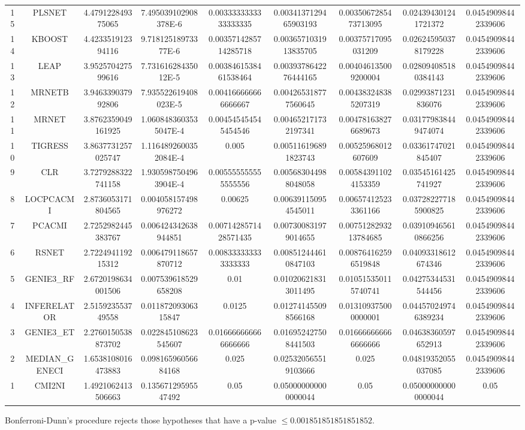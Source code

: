 \documentclass[a4paper,10pt]{article}
\begin{document}
\begin{landscape}
\begin{table}[!htp]
\begin{tabular}{ccccccccc}
15&PLSNET&4.479122849375065&7.495039102908378E-6&0.0033333333333333335&0.0034137129465903193&0.0035067285473713095&0.024394301241721372&0.04549098442339606\\
14&KBOOST&4.423351912394116&9.71812518973377E-6&0.0035714285714285718&0.0036571031913835705&0.00375717095031209&0.026245950378179228&0.04549098442339606\\
13&LEAP&3.952570427599616&7.73161628435012E-5&0.0038461538461538464&0.0039378642276444165&0.004046135009200004&0.028094085180384143&0.04549098442339606\\
12&MRNETB&3.946339037992806&7.935522619408023E-5&0.004166666666666667&0.004265318777560645&0.004383248385207319&0.02993871231836076&0.04549098442339606\\
11&MRNET&3.8762359049161925&1.0608483603535047E-4&0.004545454545454546&0.004652171732197341&0.004781638276689673&0.031779838449474074&0.04549098442339606\\
10&TIGRESS&3.8637731257025747&1.1164892600352084E-4&0.005&0.005116196891823743&0.00525968012607609&0.03361747021845407&0.04549098442339606\\
9&CLR&3.7279288322741158&1.9305987504963904E-4&0.005555555555555556&0.005683044988048058&0.005843911024153359&0.03545161425741927&0.04549098442339606\\
8&LOCPCACMI&2.8736053171804565&0.004058157498976272&0.00625&0.006391150954545011&0.006574125233361166&0.037282277185900825&0.04549098442339606\\
7&PCACMI&2.7252982445383767&0.006424342638944851&0.0071428571428571435&0.007300831979014655&0.0075128293213784685&0.039109465610866256&0.04549098442339606\\
6&RSNET&2.722494119215312&0.006479118657870712&0.008333333333333333&0.008512444610847103&0.008764162596519848&0.04093318612674346&0.04549098442339606\\
5&GENIE3_RF&2.6720198634001506&0.007539618529658208&0.01&0.010206218313011495&0.010515350115740741&0.04275344531544456&0.04549098442339606\\
4&INFERELATOR&2.515923553749558&0.01187209306315847&0.0125&0.012741455098566168&0.013109375000000001&0.044570249746389234&0.04549098442339606\\
3&GENIE3_ET&2.2760150538873702&0.022845108623545607&0.016666666666666666&0.016952427508441503&0.016666666666666666&0.04638360597652913&0.04549098442339606\\
2&MEDIAN_GENECI&1.6538108016473883&0.09816596056684168&0.025&0.025320565519103666&0.025&0.04819352055037085&0.04549098442339606\\
1&CMI2NI&1.4921062413506663&0.13567129595547492&0.05&0.050000000000000044&0.05&0.050000000000000044&0.05\\
\hline
\end{tabular}
\end{table}
Bonferroni-Dunn's procedure rejects those hypotheses that have a p-value $\le0.001851851851851852$.



\end{landscape}
\end{document}
